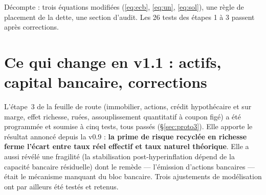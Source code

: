 \documentclass[11pt,a4paper]{article}
\begin{document}
Décompte : trois équations modifiées (\eqref{eq:ecb}, \eqref{eq:un}, \eqref{eq:sol}), une règle de placement de la dette, une section d'audit. Les 26 tests des étapes 1 à 3 passent après corrections.

\section*{Ce qui change en v1.1 : actifs, capital bancaire, corrections}
L'étape~3 de la feuille de route (immobilier, actions, crédit hypothécaire et sur marge, effet richesse, ruées, assouplissement quantitatif à coupon figé) a été programmée et soumise à cinq tests, tous passés (\S\ref{sec:proto3}). Elle apporte le résultat annoncé depuis la v0.9 : \textbf{la prime de risque recyclée en richesse ferme l'écart entre taux réel effectif et taux naturel théorique}. Elle a aussi révélé une fragilité (la stabilisation post-hyperinflation dépend de la capacité bancaire résiduelle) dont le remède — l'émission d'actions bancaires — était le mécanisme manquant du bloc bancaire. Trois ajustements de modélisation ont par ailleurs été testés et retenus.
\end{document}
